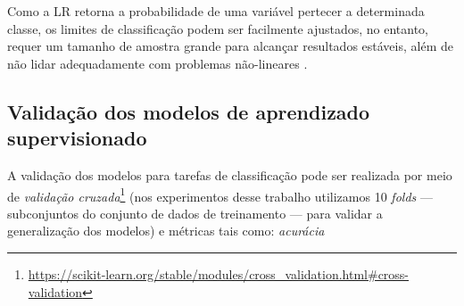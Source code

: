 \documentclass[
	12pt,				%
	oneside,			%
	a4paper,			%
	english,			%
	brazil				%
	]{abntex2ppgsi}
\begin{document}
{Como a LR retorna a probabilidade de uma variável pertecer a determinada classe, os limites de classificação podem ser facilmente ajustados, no entanto, requer um tamanho de amostra grande para alcançar resultados estáveis, além de não lidar adequadamente com problemas não-lineares \cite{khemphila2010comparing, singh2016review}.

\subsection{Validação dos modelos de aprendizado supervisionado}
\label{modelValidation}

A validação dos modelos para tarefas de classificação pode ser realizada por meio de \textit{validação cruzada}\footnote{\url{https://scikit-learn.org/stable/modules/cross\_validation.html\#cross-validation}} (nos experimentos desse trabalho utilizamos 10 \textit{folds} --- subconjuntos do conjunto de dados de treinamento --- para validar a generalização dos modelos) e métricas tais como: \textit{acurácia} }
\end{document}
